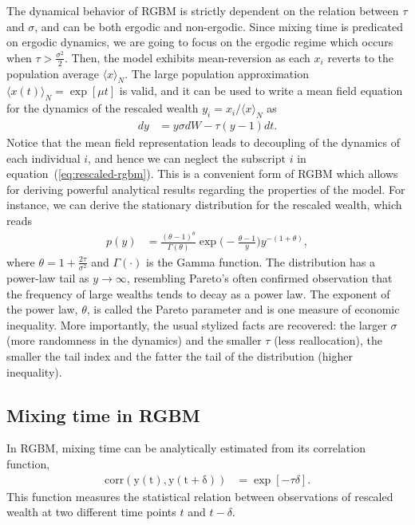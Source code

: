 \documentclass[11pt]{article}
\numberwithin{equation}{section}
\begin{document}
The dynamical behavior of RGBM is strictly dependent on the relation between $\tau$ and $\sigma$, and can be both ergodic and non-ergodic. Since mixing time is predicated on ergodic dynamics, we are going to focus on the ergodic regime which occurs when $\tau > \frac{\sigma^2}{2}$. Then, the model exhibits mean-reversion as each $x_i$ reverts to the population average $\langle x \rangle_N$. The large population approximation $\langle x(t) \rangle_N = \exp \left[\mu t\right]$ is valid, and it can be used to write a mean field equation for the dynamics of the rescaled wealth $y_i = x_i / \langle x \rangle_N$ as
\begin{align}
    d y &=   y \sigma d W - \tau (y - 1) dt.
    \label{eq:rescaled-rgbm}
\end{align}
Notice that the mean field representation leads to decoupling of the dynamics of each individual $i$, and hence we can neglect the subscript $i$ in equation~(\ref{eq:rescaled-rgbm}). This is a convenient form of RGBM which allows for deriving powerful analytical results regarding the properties of the model. For instance, we can derive the stationary distribution for the rescaled wealth, which reads
\begin{align}
    p(y) &= \frac{(\theta - 1)^{\theta}}{\Gamma(\theta)} \exp{\big(-\frac{\theta - 1}{y}\big)} y^{-(1+\theta)},
    \label{eq:stationary-distributin}
\end{align}
where $\theta = 1 + \frac{2 \tau}{\sigma^2}$ and $\Gamma(\cdot)$ is the Gamma function.  The distribution has a power-law tail as $y \to \infty$,
resembling Pareto’s often confirmed observation that the frequency of large wealths tends to decay
as a power law. The exponent of the power law, $\theta$, is called the Pareto parameter and is one
measure of economic inequality. More importantly, the usual stylized facts are recovered: the larger $\sigma$ (more randomness in the dynamics) and the smaller $\tau$ (less reallocation), the smaller the tail index and the fatter the tail of the distribution (higher inequality).

\subsection{Mixing time in RGBM}

In RGBM, mixing time can be analytically estimated from its correlation function,
\begin{align}
    \mathrm{corr(y(t), y(t+\delta))} &= \exp\left[ -\tau \delta \right].
    \label{eq:rgbm-correlation}
\end{align}
This function measures the statistical relation between observations of rescaled wealth at two different time points $t$ and $t-\delta$. 
\end{document}
